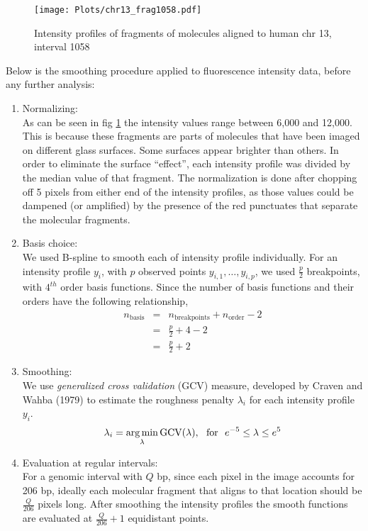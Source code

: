 \begin{figure}[H]
\begin{center}
\texttt{[image: Plots/chr13\_frag1058.pdf]}
\end{center}
\caption{Intensity profiles of fragments of molecules aligned to human chr 13, interval 1058}
\label{fig:Fig3_frag1058_orig}
\end{figure}
Below is the smoothing procedure applied to fluorescence intensity data, before any further analysis:
\begin{enumerate}
\item Normalizing:\\
As can be seen in fig \ref{fig:Fig3_frag1058_orig} the intensity values range between 6,000 and 12,000. This is because these fragments are parts of molecules that have been imaged on different glass surfaces. Some surfaces appear brighter than others. In order to eliminate the surface ``effect'', each intensity profile was divided by the median value of that fragment. The normalization is done after chopping off 5 pixels from either end of the intensity profiles, as those values could be dampened (or amplified) by the presence of the red punctuates that separate the molecular fragments.
\item Basis choice:\\
We used B-spline \cite{deBoor_1978_Splines} to smooth each of intensity profile individually. For an intensity profile $y_i$, with $p$ observed points $y_{i,1}, \dots, y_{i,p}$, we used $\frac{p}{2}$ breakpoints, with $4^{th}$ order basis functions. Since the number of basis functions and their orders have the following relationship, 
\begin{eqnarray*}
n_{\text{basis}} &=& n_{\text{breakpoints}} + n_{\text{order}} - 2 \\
                 &=& \frac{p}{2} + 4 - 2\\ 
                 &=& \frac{p}{2} + 2
\end{eqnarray*}
\item Smoothing:\\
We use {\emph{generalized cross validation}} (GCV) measure, developed by Craven and Wahba (1979) \cite{Craven_Wahba_1978_NumMath} to estimate the roughness penalty $\lambda_{i}$ for each intensity profile $y_i$.  
\[ \lambda_i = \operatorname*{arg\,min}_{\lambda} \text{GCV}(\lambda), \ \ \text{for\ \ } e^{-5} \leq \lambda \leq e^5 \]

\item Evaluation at regular intervals: \\
For a genomic interval with $Q$ bp, since each pixel in the image accounts for 206 bp, ideally each molecular fragment that aligns to that location should be $\frac{Q}{206}$ pixels long. After smoothing the intensity profiles the smooth functions are evaluated at $\frac{Q}{206} + 1$ equidistant points. 
\end{enumerate}
